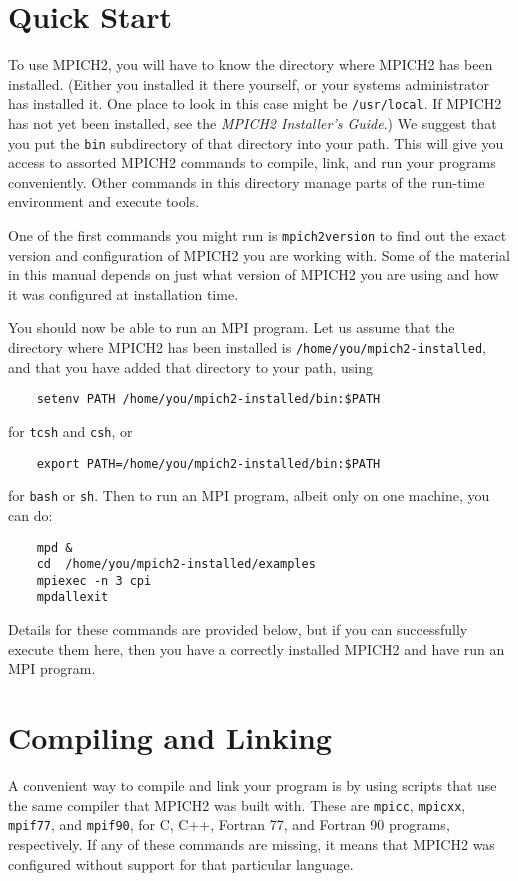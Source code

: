 \documentclass[dvipdfm,11pt]{article}
\begin{document}
\section{Quick Start}
\label{sec:quickstart}

To use MPICH2, you will have to know the directory where MPICH2 has been
installed. 
(Either you installed it there yourself, or your systems administrator has
installed it.  One place to look in this case might be \texttt{/usr/local}.
If MPICH2 has not yet been installed, see the \emph{MPICH2 Installer's Guide}.)
We suggest that you put the \texttt{bin} subdirectory of that directory into
your path.  This will give you access to assorted MPICH2 commands to
compile, link, and run your programs conveniently.  Other commands in
this directory manage parts of the run-time environment and execute
tools.  

One of the first commands you might run is \texttt{mpich2version} to
find out the exact version and configuration of MPICH2 you are working
with.  Some of the material in this manual depends on just what version
of MPICH2 you are using and how it was configured at installation time.

You should now be able to run an MPI program.  Let us assume that the
directory where MPICH2 has been installed is
\texttt{/home/you/mpich2-installed}, and that you have added that directory to
your path, using 
\begin{verbatim}
    setenv PATH /home/you/mpich2-installed/bin:$PATH
\end{verbatim}
for \texttt{tcsh} and \texttt{csh}, or 
\begin{verbatim}
    export PATH=/home/you/mpich2-installed/bin:$PATH
\end{verbatim}
for \texttt{bash} or \texttt{sh}.
Then to run an MPI program, albeit only on one machine, you can do:
\begin{verbatim}
    mpd &
    cd  /home/you/mpich2-installed/examples
    mpiexec -n 3 cpi
    mpdallexit
\end{verbatim}
Details for these commands are provided below, but if you can
successfully execute them here, then you have a correctly installed
MPICH2 and have run an MPI program. 

\section{Compiling and Linking}
\label{sec:compiling}

A convenient way to compile and link your program is by using scripts
that use the same compiler that MPICH2 was built with.  These are
\texttt{mpicc}, \texttt{mpicxx}, \texttt{mpif77}, and \texttt{mpif90},
for C, C++, Fortran 77, and Fortran 90 programs, respectively.  If any
of these commands are missing, it means that MPICH2 was configured
without support for that particular language.
\end{document}
